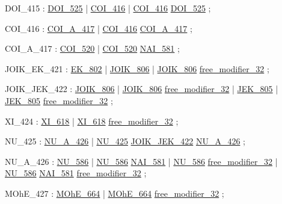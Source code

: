 \label{html:y415}
DOI_415                 :  \hyperref[html:y525]{DOI_525}
                        |  \hyperref[html:y416]{COI_416}
                        |  \hyperref[html:y416]{COI_416}  \hyperref[html:y525]{DOI_525}
                        ;

\label{html:y416}
COI_416                 :  \hyperref[html:y417]{COI_A_417}
                        |  \hyperref[html:y416]{COI_416}  \hyperref[html:y417]{COI_A_417}
                        ;

\label{html:y417}
COI_A_417               :  \hyperref[html:y520]{COI_520}
                        |  \hyperref[html:y520]{COI_520}  \hyperref[html:y581]{NAI_581}
                        ;

\label{html:y421}
JOIK_EK_421             :  \hyperref[html:y802]{EK_802}
                        |  \hyperref[html:y806]{JOIK_806}
                        |  \hyperref[html:y806]{JOIK_806}  \hyperref[html:y32]{free_modifier_32}
                        ;

\label{html:y422}
JOIK_JEK_422            :  \hyperref[html:y806]{JOIK_806}
                        |  \hyperref[html:y806]{JOIK_806}  \hyperref[html:y32]{free_modifier_32}
                        |  \hyperref[html:y805]{JEK_805}
                        |  \hyperref[html:y805]{JEK_805}  \hyperref[html:y32]{free_modifier_32}
                        ;

\label{html:y424}
XI_424                  :  \hyperref[html:y618]{XI_618}
                        |  \hyperref[html:y618]{XI_618}  \hyperref[html:y32]{free_modifier_32}
                        ;

\label{html:y425}
NU_425                  :  \hyperref[html:y426]{NU_A_426}
                        |  \hyperref[html:y425]{NU_425}  \hyperref[html:y422]{JOIK_JEK_422}  \hyperref[html:y426]{NU_A_426}
                        ;

\label{html:y426}
NU_A_426                :  \hyperref[html:y586]{NU_586}
                        |  \hyperref[html:y586]{NU_586}  \hyperref[html:y581]{NAI_581}
                        |  \hyperref[html:y586]{NU_586}  \hyperref[html:y32]{free_modifier_32}
                        |  \hyperref[html:y586]{NU_586}  \hyperref[html:y581]{NAI_581}  \hyperref[html:y32]{free_modifier_32}
                        ;

\label{html:y427}
MOhE_427                :  \hyperref[html:y664]{MOhE_664}
                        |  \hyperref[html:y664]{MOhE_664}  \hyperref[html:y32]{free_modifier_32}
                        ;

